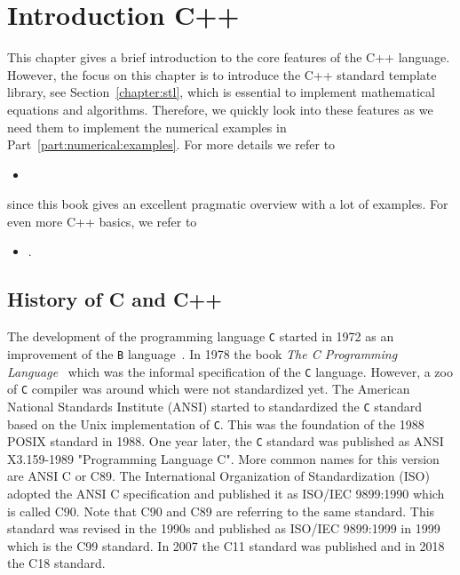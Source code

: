 
\chapter{Introduction C++}
This chapter gives a brief introduction to the core features of the C++ language. However, the focus on this chapter is to introduce the C++ standard template library, see Section~\ref{chapter:stl}, which is essential to implement mathematical equations and algorithms. Therefore, we quickly look into these features as we need them to implement the numerical examples in Part~\ref{part:numerical:examples}. For more details we refer to
\begin{itemize}
\item {}
\end{itemize}
since this book gives an excellent pragmatic overview with a lot of examples. For even more C++ basics, we refer to
\begin{itemize}
\item {}.
\end{itemize}
\section{History of C and C++}
The development of the programming language \texttt{C} started in 1972 as an improvement of the \texttt{B} language~\cite{ritchie1993development}. In 1978 the book \textit{The C Programming Language}~\cite{kernighan2006c} which was the informal specification of the \texttt{C} language. However, a zoo of \texttt{C} compiler was around which were not standardized yet. The American National Standards Institute (ANSI) started to standardized the \texttt{C} standard based on the Unix implementation of \texttt{C}. This was the foundation of the 1988 POSIX standard in 1988. One year later, the \texttt{C} standard was published as ANSI X3.159-1989 "Programming Language C". More common names for this version are ANSI C or C89. The International Organization of Standardization (ISO) adopted the ANSI C specification and published it as ISO/IEC 9899:1990 which is called C90. Note that C90 and C89 are referring to the same standard. This standard was revised in the 1990s and published as ISO/IEC 9899:1999 in 1999 which is the C99 standard. In 2007 the C11 standard was published and in 2018 the C18 standard.\\

